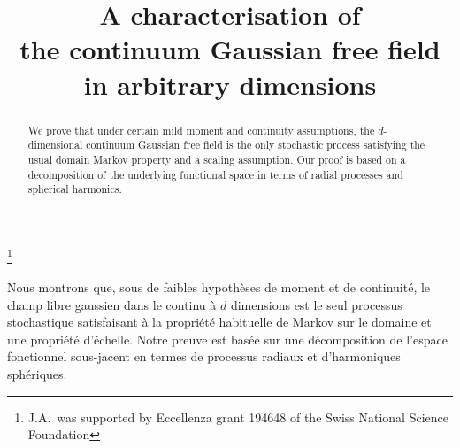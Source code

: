 \documentclass[JEP,XML,SOM,Unicode,published]{cedram}
\theoremstyle{definition}
\begin{document}
\title[A characterisation of the continuum Gaussian free field in arbitrary dimensions]{A characterisation of\\ the continuum Gaussian free field\\ in arbitrary dimensions}

\author[\initial{J.} \lastname{Aru}]{ }
\address{Institute of Mathematics, École Polytechnique Fédérale de Lausanne\\
CH-1015 Lausanne, Switzerland}

\author[\initial{E.} \lastname{Powell}]{ }
\address{Department of Mathematical and Computing Sciences, Durham University\\
Upper Mountjoy Campus, Stockton Rd, Durham DH1 3LE, UK}

\thanks{J.A.\ was supported by Eccellenza grant 194648 of the Swiss National Science Foundation}

\begin{abstract}
We prove that under certain mild moment and continuity assumptions, the $d$\nobreakdash-dimensional continuum Gaussian free field is the only stochastic process satisfying the usual domain Markov property and a scaling assumption. Our proof is based on a decomposition of the underlying functional space in terms of radial processes and spherical harmonics.
\end{abstract}





\begin{altabstract}
Nous montrons que, sous de faibles hypothèses de moment et de continuité, le champ libre gaussien dans le continu à $d$ dimensions est le seul processus stochastique satisfaisant à la propriété habituelle de Markov sur le domaine et une propriété d'échelle. Notre preuve est basée sur une décomposition de l'espace fonctionnel sous-jacent en termes de processus radiaux et d'harmoniques sphériques.
\end{altabstract}
\maketitle
\vspace*{-\baselineskip}
\tableofcontents
\end{document}
